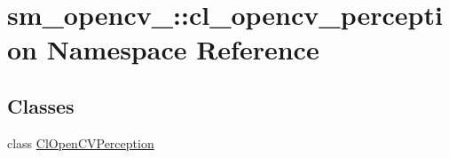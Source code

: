 \hypertarget{namespacesm__opencv__2_1_1cl__opencv__perception}{}\section{sm\+\_\+opencv\+\_\+:\+:cl\+\_\+opencv\+\_\+perception Namespace Reference}
\label{namespacesm__opencv__2_1_1cl__opencv__perception}
\subsection*{Classes}
\begin{DoxyCompactItemize}
\item 
class \hyperlink{classsm__opencv__2_1_1cl__opencv__perception_1_1ClOpenCVPerception}{Cl\+Open\+C\+V\+Perception}
\end{DoxyCompactItemize}
